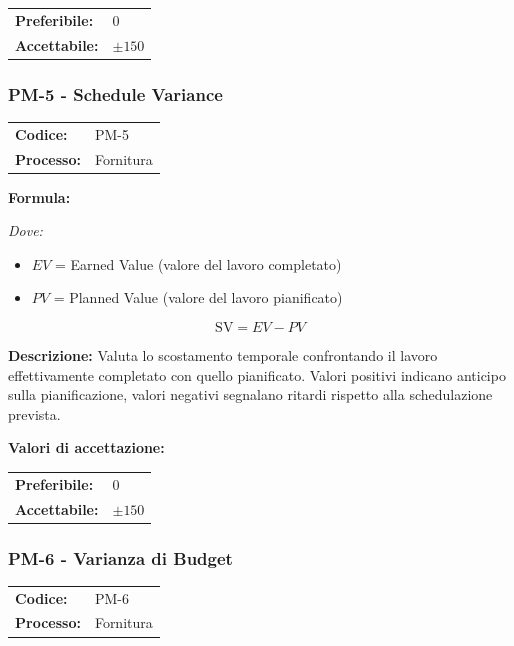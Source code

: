 \documentclass[a4paper,11pt,oneside]{scrartcl}
\begin{document}
\noindent
\begin{tabular}{@{}ll@{}}
\textbf{Preferibile:} & $0$ \\
\textbf{Accettabile:} & $\pm 150$ \\
\end{tabular}

\subsubsection{PM-5 - Schedule Variance}

\noindent
\begin{tabular}{@{}p{}p{}@{}}
\textbf{Codice:} & PM-5 \\
\textbf{Processo:} & Fornitura \\
\end{tabular}

\vspace{0.3cm}
\noindent\textbf{Formula:}

\noindent\textit{Dove:}
\begin{itemize}[leftmargin=1.5cm, topsep=0pt, itemsep=0pt]
    \item $EV$ = Earned Value (valore del lavoro completato)
    \item $PV$ = Planned Value (valore del lavoro pianificato)
\end{itemize}

\[
\text{SV} = EV - PV
\]

\noindent\textbf{Descrizione:} Valuta lo scostamento temporale confrontando il lavoro effettivamente completato con quello pianificato. Valori positivi indicano anticipo sulla pianificazione, valori negativi segnalano ritardi rispetto alla schedulazione prevista.

\vspace{0.2cm}
\noindent\textbf{Valori di accettazione:}
\vspace{0.1cm}

\noindent
\begin{tabular}{@{}ll@{}}
\textbf{Preferibile:} & $0$ \\
\textbf{Accettabile:} & $\pm 150$ \\
\end{tabular}

\subsubsection{PM-6 - Varianza di Budget}

\noindent
\begin{tabular}{@{}p{}p{}@{}}
\textbf{Codice:} & PM-6 \\
\textbf{Processo:} & Fornitura \\
\end{tabular}
\end{document}
